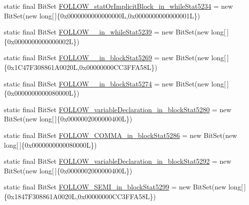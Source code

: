 \begin{DoxyCompactItemize}
\item 
static final Bit\-Set \hyperlink{classorg_1_1tzi_1_1use_1_1parser_1_1shell_1_1_shell_command_parser_aa82295f0292ecc7df0a89c94ef423fb8}{F\-O\-L\-L\-O\-W\-\_\-stat\-Or\-Implicit\-Block\-\_\-in\-\_\-while\-Stat5234} = new Bit\-Set(new long\mbox{[}$\,$\mbox{]}\{0x0000000000000000\-L,0x0000000000000001\-L\})
\item 
static final Bit\-Set \hyperlink{classorg_1_1tzi_1_1use_1_1parser_1_1shell_1_1_shell_command_parser_afe53d393da3e380d2f3c3b15b2adae34}{F\-O\-L\-L\-O\-W\-\_\-\_\-in\-\_\-while\-Stat5239} = new Bit\-Set(new long\mbox{[}$\,$\mbox{]}\{0x0000000000000002\-L\})
\item 
static final Bit\-Set \hyperlink{classorg_1_1tzi_1_1use_1_1parser_1_1shell_1_1_shell_command_parser_a0e79073ad12c83d8922d972c9408258d}{F\-O\-L\-L\-O\-W\-\_\-\_\-in\-\_\-block\-Stat5269} = new Bit\-Set(new long\mbox{[}$\,$\mbox{]}\{0x1\-C47\-F308861\-A0020\-L,0x00000000\-C\-C3\-F\-F\-A58\-L\})
\item 
static final Bit\-Set \hyperlink{classorg_1_1tzi_1_1use_1_1parser_1_1shell_1_1_shell_command_parser_a353432cfaa3cf1e4b44fe10189ffe819}{F\-O\-L\-L\-O\-W\-\_\-\_\-in\-\_\-block\-Stat5274} = new Bit\-Set(new long\mbox{[}$\,$\mbox{]}\{0x0000000000080000\-L\})
\item 
static final Bit\-Set \hyperlink{classorg_1_1tzi_1_1use_1_1parser_1_1shell_1_1_shell_command_parser_acfb3d70d322d224268f0066ff8ec6107}{F\-O\-L\-L\-O\-W\-\_\-variable\-Declaration\-\_\-in\-\_\-block\-Stat5280} = new Bit\-Set(new long\mbox{[}$\,$\mbox{]}\{0x0000002000000400\-L\})
\item 
static final Bit\-Set \hyperlink{classorg_1_1tzi_1_1use_1_1parser_1_1shell_1_1_shell_command_parser_a0dc4eb37c9cb39388ffd268268327299}{F\-O\-L\-L\-O\-W\-\_\-\-C\-O\-M\-M\-A\-\_\-in\-\_\-block\-Stat5286} = new Bit\-Set(new long\mbox{[}$\,$\mbox{]}\{0x0000000000080000\-L\})
\item 
static final Bit\-Set \hyperlink{classorg_1_1tzi_1_1use_1_1parser_1_1shell_1_1_shell_command_parser_af87ce8316771266f2e6fb39b37a163f7}{F\-O\-L\-L\-O\-W\-\_\-variable\-Declaration\-\_\-in\-\_\-block\-Stat5292} = new Bit\-Set(new long\mbox{[}$\,$\mbox{]}\{0x0000002000000400\-L\})
\item 
static final Bit\-Set \hyperlink{classorg_1_1tzi_1_1use_1_1parser_1_1shell_1_1_shell_command_parser_a51dbeef157f3bce7d46f7ac7eef0b33e}{F\-O\-L\-L\-O\-W\-\_\-\-S\-E\-M\-I\-\_\-in\-\_\-block\-Stat5299} = new Bit\-Set(new long\mbox{[}$\,$\mbox{]}\{0x1847\-F308861\-A0020\-L,0x00000000\-C\-C3\-F\-F\-A58\-L\})

\end{DoxyCompactItemize}
